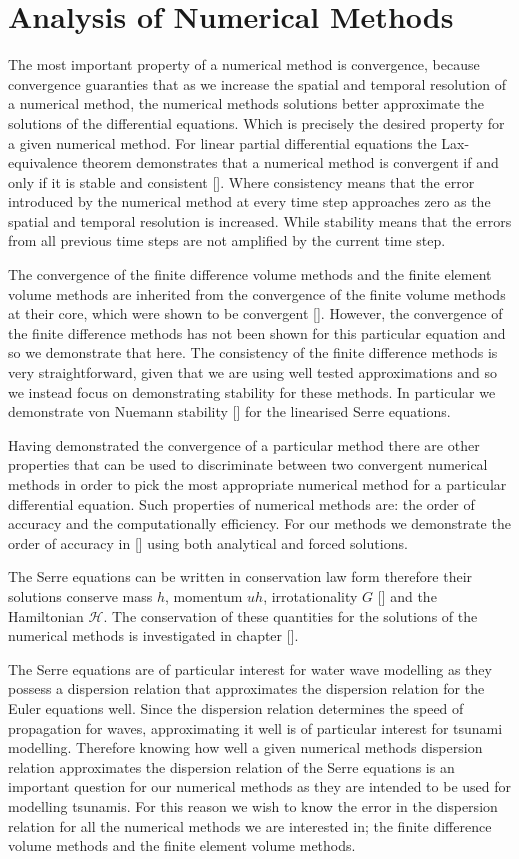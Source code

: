 
\chapter{Analysis of Numerical Methods}
\label{chp:AnalNumMethod}
The most important property of a numerical method is convergence, because convergence guaranties that as we increase the spatial and temporal resolution of a numerical method, the numerical methods solutions better approximate the solutions of the differential equations. Which is precisely the desired property for a given  numerical method. For linear partial differential equations the Lax-equivalence theorem demonstrates that a numerical method is convergent if and only if it is stable and consistent []. Where consistency means that the error introduced by the numerical method at every time step approaches zero as the spatial and temporal resolution is increased. While stability means that the errors from all previous time steps are not amplified by the current time step.

The convergence of the finite difference volume methods and the finite element volume methods are inherited from the convergence of the finite volume methods at their core, which were shown to be convergent []. However, the convergence of the finite difference methods has not been shown for this particular equation and so we demonstrate that here. The consistency of the finite difference methods is very straightforward, given that we are using well tested approximations and so we instead focus on demonstrating stability for these methods. In particular we demonstrate von Nuemann stability [] for the linearised Serre equations. 

Having demonstrated the convergence of a particular method there are other properties that can be used to discriminate between two convergent numerical methods in order to pick the most appropriate numerical method for a particular differential equation. Such properties of numerical methods are: the order of accuracy and the computationally efficiency. For our methods we demonstrate the order of accuracy in [] using both analytical and forced solutions. 

The Serre equations can be written in conservation law form therefore their solutions conserve mass $h$, momentum $uh$, irrotationality $G$ [] and the Hamiltonian $\mathcal{H}$. The conservation of these quantities for the solutions of the numerical methods is investigated in chapter [].

The Serre equations are of particular interest for water wave modelling as they possess a dispersion relation that approximates the dispersion relation for the Euler equations well. Since the dispersion relation determines the speed of propagation for waves, approximating it well is of particular interest for tsunami modelling. Therefore knowing how well a given numerical methods dispersion relation approximates the dispersion relation of the Serre equations is an important question for our numerical methods as they are intended to be used for modelling tsunamis. For this reason we wish to know the error in the dispersion relation for all the numerical methods we are interested in; the finite difference volume methods and the finite element volume methods. 

